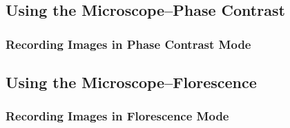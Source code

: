 \documentclass{article}
\begin{document}
\subsection{Using the Microscope--Phase Contrast}

\subsubsection{Recording Images in Phase Contrast Mode}



\subsection{Using the Microscope--Florescence}



\subsubsection{Recording Images in Florescence Mode}
\end{document}
